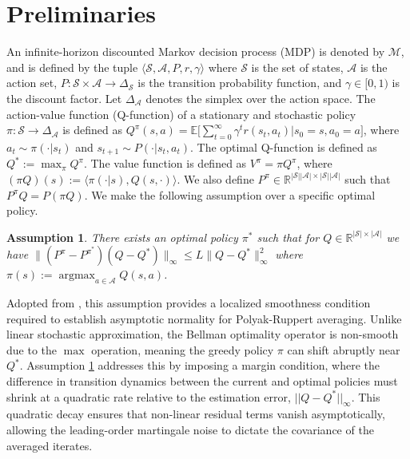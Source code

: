 \documentclass{opt2025} %
\DeclareMathOperator{\argmax}{argmax}
\newtheorem{assumption}[theorem]{Assumption}
\newcommand{\cA}{\mathcal{A}}
\newcommand{\cS}{\mathcal{S}}
\begin{document}
\section{Preliminaries}



An infinite-horizon discounted Markov decision process (MDP) is denoted by $\mathcal{M}$, and is defined by the tuple $\langle \cS, \cA, P, r, \gamma \rangle$ where $\cS$ is the set of states, $\cA$ is the action set, $P: \cS \times \cA \rightarrow \Delta_\cS$ is the transition probability function, and $\gamma \in [0, 1)$ is the discount factor. Let $\Delta_{\cA}$ denotes the simplex over the action space. The action-value function (Q-function) of a stationary and stochastic policy $\pi: \cS \rightarrow \Delta_{\cA}$ is defined as $Q^{\pi}(s,a) = \mathbb{E} \Big[\sum_{t=0}^\infty \gamma^t r(s_t, a_t)|s_0=s,a_0=a\Big]$, where $a_t \sim \pi( \cdot | s_t)$ and $s_{t+1} \sim P( \cdot | s_t, a_t)$. The optimal Q-function is defined as $Q^*:=\max_{\pi}Q^{\pi}$. The value function is defined as $V^{\pi} = \pi Q^{\pi}$, where $(\pi Q)(s) :=\langle \pi(\cdot | s), Q(s,\cdot) \rangle$. We also define $P^{\pi} \in \mathbb{R}^{|\mathcal{S}||\mathcal{A}|\times |\mathcal{S}||\mathcal{A}|}$ such that $P^{\pi}Q=P(\pi Q)$. We make the following assumption over a specific optimal policy.
\begin{assumption}
\label{asm_1}
There exists an optimal policy $\pi^*$ such that for $Q \in \mathbb{R}^{|\mathcal{S}|\times|\mathcal{A}|}$ we have $\| (P^{\pi}-P^{\pi^*})(Q-Q^*)\|_{\infty} \leq L\|Q-Q^*\|^2_{\infty}$ where $\pi(s):=\argmax_{a\in\mathcal{A}}Q(s,a)$.
\end{assumption}

Adopted from \citet{li2023statistical}, this assumption provides a localized smoothness condition required to establish asymptotic normality for Polyak-Ruppert averaging. Unlike linear stochastic approximation, the Bellman optimality operator is non-smooth due to the $\max$ operation, meaning the greedy policy $\pi$ can shift abruptly near $Q^*$. Assumption \ref{asm_1} addresses this by imposing a margin condition, where the difference in transition dynamics between the current and optimal policies must shrink at a quadratic rate relative to the estimation error, $||Q - Q^*||_\infty$. This quadratic decay ensures that non-linear residual terms vanish asymptotically, allowing the leading-order martingale noise to dictate the covariance of the averaged iterates.
\end{document}
